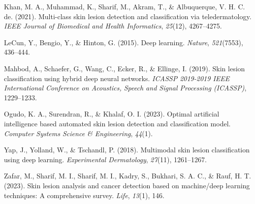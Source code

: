 \documentclass[
  12pt,
  oneside]{article}
\newlength{\cslhangindent}
\newenvironment{CSLReferences}[2] %
 {\begin{list}{}{%
  \setlength{\itemindent}{0pt}
  \setlength{\leftmargin}{0pt}
  \setlength{\parsep}{0pt}
  \ifodd #1
   \setlength{\leftmargin}{\cslhangindent}
   \setlength{\itemindent}{-1\cslhangindent}
  \fi
  \setlength{\itemsep}{#2\baselineskip}}}
 {\end{list}}
\begin{document}
\begin{CSLReferences}{1}{0}
Khan, M. A., Muhammad, K., Sharif, M., Akram, T., \& Albuquerque, V. H.
C. de. (2021). Multi-class skin lesion detection and classification via
teledermatology. \emph{IEEE Journal of Biomedical and Health
Informatics}, \emph{25}(12), 4267--4275.

LeCun, Y., Bengio, Y., \& Hinton, G. (2015). Deep learning.
\emph{Nature}, \emph{521}(7553), 436--444.

Mahbod, A., Schaefer, G., Wang, C., Ecker, R., \& Ellinge, I. (2019).
Skin lesion classification using hybrid deep neural networks.
\emph{ICASSP 2019-2019 IEEE International Conference on Acoustics,
Speech and Signal Processing (ICASSP)}, 1229--1233.

Ogudo, K. A., Surendran, R., \& Khalaf, O. I. (2023). Optimal artificial
intelligence based automated skin lesion detection and classification
model. \emph{Computer Systems Science \& Engineering}, \emph{44}(1).

Yap, J., Yolland, W., \& Tschandl, P. (2018). Multimodal skin lesion
classification using deep learning. \emph{Experimental Dermatology},
\emph{27}(11), 1261--1267.

Zafar, M., Sharif, M. I., Sharif, M. I., Kadry, S., Bukhari, S. A. C.,
\& Rauf, H. T. (2023). Skin lesion analysis and cancer detection based
on machine/deep learning techniques: A comprehensive survey.
\emph{Life}, \emph{13}(1), 146.

\end{CSLReferences}
\end{document}

